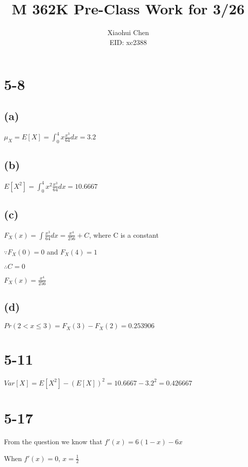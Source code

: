 \documentclass[12pt]{article}
\author{Xiaohui Chen \\EID: xc2388}
\title{M 362K Pre-Class Work for 3/26}
\begin{document}
\maketitle
\begin{spacing}{2.0}

\section*{5-8}

\subsection*{(a)}

$\mu_X= E[X] = \int_{0}^{4} x\frac{x^3}{64} dx = 3.2$

\subsection*{(b)}

$E[X^2]= \int_{0}^{4} x^2\frac{x^3}{64} dx = 10.6667$

\subsection*{(c)}

$F_X(x)= \int \frac{x^3}{64} dx = \frac{x^4}{256}+C $, where C is a constant

$\because F_X(0)=0$ and $F_X(4)=1$

$\therefore C=0$

$F_X(x)= \frac{x^4}{256}$

\subsection*{(d)}

$Pr(2 <x \le 3) = F_X(3)-F_X(2) = 0.253906$

\section*{5-11}

$Var[X] = E[X^2] - \left( E[X] \right)^2 = 10.6667-3.2^2 = 0.426667$

\section*{5-17}

From the question we know that $f'(x) = 6(1-x)- 6x$

When $f'(x)= 0 $, $x=\frac{1}{2}$


\end{spacing}
\end{document}

